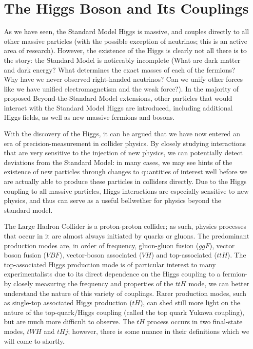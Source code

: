 \section{The Higgs Boson and Its Couplings} \label{sec:Higgs Couplings} 

As we have seen, the Standard Model Higgs is massive, and couples directly to all other massive particles (with the possible exception of neutrinos; this is an active area of research). However, the existence of the Higgs is clearly not all there is to the story: the Standard Model is noticeably incomplete (What are dark matter and dark energy? What determines the exact masses of each of the fermions? Why have we never observed right-handed neutrinos? Can we unify other forces like we have unified electromagnetism and the weak force?). In the majority of proposed Beyond-the-Standard Model extensions, other particles that would interact with the Standard Model Higgs are introduced, including additional Higgs fields, as well as new massive fermions and bosons.

With the discovery of the Higgs, it can be argued that we have now entered an era of precision-measurement in collider physics. By closely studying interactions that are very sensitive to the injection of new physics, we can potentially detect deviations from the Standard Model: in many cases, we may see hints of the existence of new particles through changes to quantities of interest well before we are actually able to produce these particles in colliders directly. Due to the Higgs coupling to all massive particles, Higgs interactions are especially sensitive to new physics, and thus can serve as a useful bellwether for physics beyond the standard model.

The Large Hadron Collider is a proton-proton collider; as such, physics processes that occur in it are almost always initiated by quarks or gluons. The predominant production modes are, in order of frequency, gluon-gluon fusion ($ggF$), vector boson fusion ($VBF$), vector-boson associated ($VH$) and top-associated ($ttH$). The top-associated Higgs production mode is of particular interest to many experimentalists due to its direct dependence on the Higgs coupling to a fermion- by closely measuring the frequency and properties of the $ttH$ mode, we can better understand the nature of this variety of couplings. Rarer production modes, such as single-top associated Higgs production ($tH$), can shed still more light on the nature of the top-quark/Higgs coupling (called the top quark Yukawa coupling), but are much more difficult to observe. The $tH$ process occurs in two final-state modes, $tWH$ and $tHj$; however, there is some nuance in their definitions which we will come to shortly.

